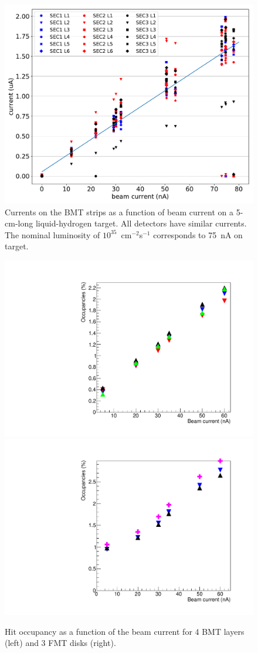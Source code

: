\begin{figure}[htb]
 \includegraphics[width=1.0\columnwidth,keepaspectratio]{images/BMT_IvsLumi}
 \caption{Currents on the BMT strips as a function of beam current on a 5-cm-long liquid-hydrogen target. All detectors
   have similar currents. The nominal luminosity of $10^{35}$~cm$^{-2}$s$^{-1}$ corresponds to 75~nA on target.}
 \label{fig:mm-fig14}
\end{figure}

\begin{figure}[htb]
 \includegraphics[width=.49\columnwidth,keepaspectratio]{images/OccupanciesVSbeamCurrent_BMT_only4Layers.pdf}
 \includegraphics[width=.49\columnwidth,keepaspectratio]{images/OccupanciesVSbeamCurrent_FMT_only3Layers.pdf}
 \caption{Hit occupancy as a function of the beam current for 4 BMT layers (left) and 3 FMT disks (right).}
 \label{fig:mm-fig16}
\end{figure}

